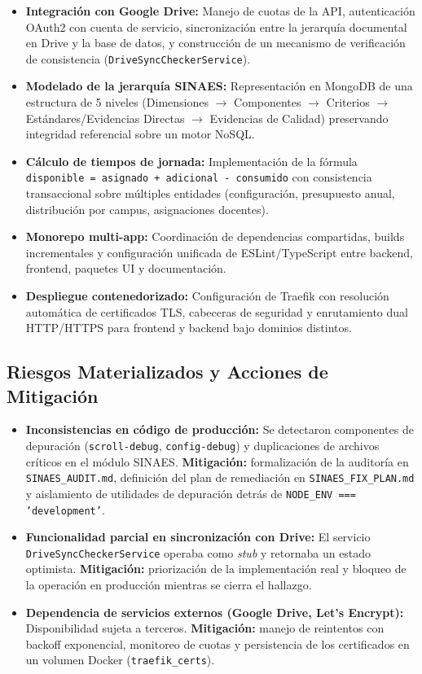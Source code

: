\begin{itemize}
    \item \textbf{Integración con Google Drive:} Manejo de cuotas de la API, autenticación OAuth2 con cuenta de servicio, sincronización entre la jerarquía documental en Drive y la base de datos, y construcción de un mecanismo de verificación de consistencia (\texttt{DriveSyncCheckerService}).
    \item \textbf{Modelado de la jerarquía SINAES:} Representación en MongoDB de una estructura de 5 niveles (Dimensiones $\rightarrow$ Componentes $\rightarrow$ Criterios $\rightarrow$ Estándares/Evidencias Directas $\rightarrow$ Evidencias de Calidad) preservando integridad referencial sobre un motor NoSQL.
    \item \textbf{Cálculo de tiempos de jornada:} Implementación de la fórmula \texttt{disponible = asignado + adicional - consumido} con consistencia transaccional sobre múltiples entidades (configuración, presupuesto anual, distribución por campus, asignaciones docentes).
    \item \textbf{Monorepo multi-app:} Coordinación de dependencias compartidas, builds incrementales y configuración unificada de ESLint/TypeScript entre backend, frontend, paquetes UI y documentación.
    \item \textbf{Despliegue contenedorizado:} Configuración de Traefik con resolución automática de certificados TLS, cabeceras de seguridad y enrutamiento dual HTTP/HTTPS para frontend y backend bajo dominios distintos.
\end{itemize}

\subsection{Riesgos Materializados y Acciones de Mitigación}

\begin{itemize}
    \item \textbf{Inconsistencias en código de producción:} Se detectaron componentes de depuración (\texttt{scroll-debug}, \texttt{config-debug}) y duplicaciones de archivos críticos en el módulo SINAES. \textbf{Mitigación:} formalización de la auditoría en \texttt{SINAES\_AUDIT.md}, definición del plan de remediación en \texttt{SINAES\_FIX\_PLAN.md} y aislamiento de utilidades de depuración detrás de \texttt{NODE\_ENV === 'development'}.
    \item \textbf{Funcionalidad parcial en sincronización con Drive:} El servicio \texttt{DriveSyncCheckerService} operaba como \emph{stub} y retornaba un estado optimista. \textbf{Mitigación:} priorización de la implementación real y bloqueo de la operación en producción mientras se cierra el hallazgo.
    \item \textbf{Dependencia de servicios externos (Google Drive, Let's Encrypt):} Disponibilidad sujeta a terceros. \textbf{Mitigación:} manejo de reintentos con backoff exponencial, monitoreo de cuotas y persistencia de los certificados en un volumen Docker (\texttt{traefik\_certs}).
\end{itemize}

